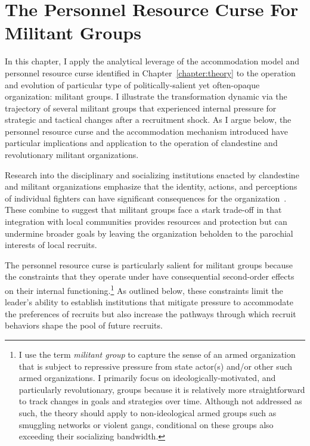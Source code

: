\chapter{The Personnel Resource Curse For Militant Groups}
\label{chapter:militants}


In this chapter, I apply the analytical leverage of the accommodation model and personnel resource curse identified in Chapter~\ref{chapter:theory} to the operation and evolution of particular type of politically-salient yet often-opaque organization: militant groups. I illustrate the transformation dynamic via the trajectory of several militant groups that experienced internal pressure for strategic and tactical changes after a recruitment shock. As I argue below, the personnel resource curse and the accommodation mechanism introduced have particular implications and application to the operation of clandestine and revolutionary militant organizations.  

Research into the disciplinary and socializing institutions enacted by clandestine and militant organizations emphasize that the identity, actions, and perceptions of individual fighters can have significant consequences for the organization~\autocite{beber2013logic, cohen2013explaining, green2015commander, kalyvas2006logic, schubiger2017ideology, staniland2014networks,  weinstein2006inside}. These combine to suggest that militant groups face a stark trade-off in that integration with local communities provides resources and protection but can undermine broader goals by leaving the organization beholden to the parochial interests of local recruits.

The personnel resource curse is particularly salient for militant groups because the constraints that they operate under have consequential second-order effects on their internal functioning.\footnote{I use the term \textit{militant group} to capture the sense of an armed organization that is subject to repressive pressure from state actor(s) and/or other such armed organizations. I primarily focus on ideologically-motivated, and particularly revolutionary, groups because it is relatively more straightforward to track changes in goals and strategies over time. Although not addressed as such, the theory should apply to non-ideological armed groups such as smuggling networks or violent gangs, conditional on these groups also exceeding their socializing bandwidth.} As outlined below, these constraints limit the leader's ability to establish institutions that mitigate pressure to accommodate the preferences of recruits but also increase the pathways through which recruit behaviors shape the pool of future recruits.


